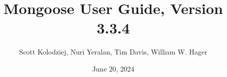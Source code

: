 \title{Mongoose User Guide, Version 3.3.4}
\author{Scott Kolodziej, Nuri Yeralan, Tim Davis, William W. Hager}
\date{June 20, 2024}
